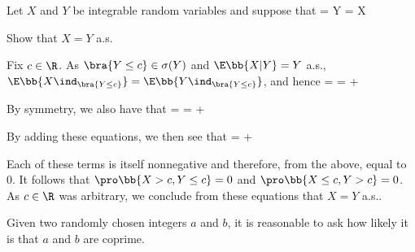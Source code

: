 \begin{problem}
Let $X$ and $Y$ be integrable random variables and suppose that
\be
\E{} = Y\quad {}\quad \E{} = X\ 
\ee

Show that $X = Y$ a.s.
\end{problem}%

\begin{solution}[\bf Solution.]
Fix $c \in \R$. As $\bra{Y \leq  c} \in \sigma(Y)$ and $\E\bb{X|Y} = Y$ a.s., $\E\bb{X\ind_{\bra{Y\leq c}}} = \E\bb{Y\ind_{\bra{Y\leq c}}}$, and hence
 = \E{} = \E{}+\E{}
\ee

By symmetry, we also have that
 = \E{} = \E{}+\E{}
\ee

By adding these equations, we then see that
 = \E{} + \E{}
\ee

Each of these terms is itself nonnegative and therefore, from the above, equal to 0. It follows that $\pro\bb{X > c,Y \leq  c} = 0$ and $\pro\bb{X \leq  c,Y > c} = 0$. As $c \in \R$ was arbitrary, we conclude from these equations that $X =Y$ a.s..
\end{solution}

\begin{problem}
Given two randomly chosen integers $a$ and $b$, it is reasonable to ask how likely it is that $a$ and $b$ are coprime.
\end{problem}

